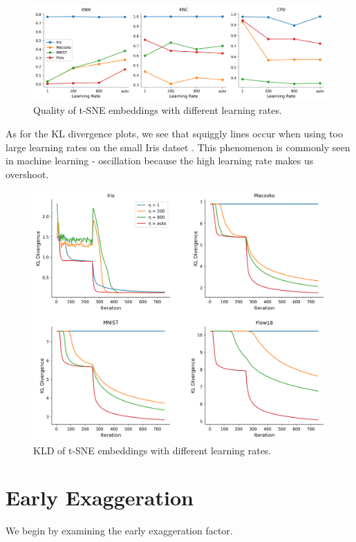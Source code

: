 \begin{figure}[h]
    \centering 
        \includegraphics[width=\linewidth]{../code/figures/eta_3_quality_measures.png}
        \caption{Quality of t-SNE embeddings with different learning rates.}
    \label{fig:eta_quality}
\end{figure}
As for the KL divergence plots, we see that squiggly lines occur when using too large learning rates on the small Iris datset . This phenomenon is commonly seen in machine learning - oscillation because the high learning rate makes us overshoot. 
\begin{figure}[h]
    \centering 
        \includegraphics[width=\linewidth]{../code/figures/eta_kl_divergences_grid.png}
        \caption{KLD of t-SNE embeddings with different learning rates.}
    \label{fig:eta_kld}
\end{figure}
\newpage 
\section{Early Exaggeration}
We begin by examining the early exaggeration factor. 

